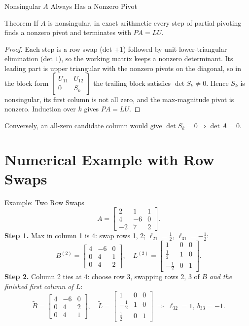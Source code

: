 \documentclass[11pt,aspectratio=169]{beamer}
\newcommand{\mat}[1]{\begin{bmatrix}#1\end{bmatrix}}
\begin{document}
\begin{frame}{Nonsingular $A$ Always Has a Nonzero Pivot}
  \small
  \begin{block}{Theorem}
    If $A$ is nonsingular, in exact arithmetic every step of partial pivoting finds a
    nonzero pivot and terminates with $PA=LU$.
  \end{block}
  \begin{proof}
    Each step is a row swap (det $\pm1$) followed by unit lower-triangular elimination
    (det $1$), so the working matrix keeps a nonzero determinant. Its leading part is
    upper triangular with the nonzero pivots on the diagonal, so in the block form
    $\mat{U_{11}&U_{12}\\0&S_k}$ the trailing block satisfies $\det S_k\neq0$. Hence
    $S_k$ is nonsingular, its first column is not all zero, and the max-magnitude pivot
    is nonzero. Induction over $k$ gives $PA=LU$.
  \end{proof}
  Conversely, an all-zero candidate column would give $\det S_k=0\Rightarrow\det A=0$.
\end{frame}

\section{Numerical Example with Row Swaps}

\begin{frame}{Example: Two Row Swaps}
  \[
    A=\mat{2&1&1\\4&-6&0\\-2&7&2}.
  \]
  \small
  \textbf{Step 1.} Max in column 1 is $4$: swap rows 1, 2; $\ell_{21}=\tfrac12,\ \ell_{31}=-\tfrac12$:
  \[
    B^{(2)}=\mat{4&-6&0\\0&4&1\\0&4&2},\quad
    L^{(2)}=\mat{1&0&0\\ \tfrac12&1&0\\ -\tfrac12&0&1}.
  \]
  \textbf{Step 2.} Column 2 ties at $4$: choose row 3, swapping rows 2, 3 of $B$ \emph{and
  the finished first column of $L$}:
  \[
    \widetilde B=\mat{4&-6&0\\0&4&2\\0&4&1},\quad
    \widetilde L=\mat{1&0&0\\ -\tfrac12&1&0\\ \tfrac12&0&1}
    \;\Rightarrow\; \ell_{32}=1,\ b_{33}=-1.
  \]
\end{frame}
\end{document}
